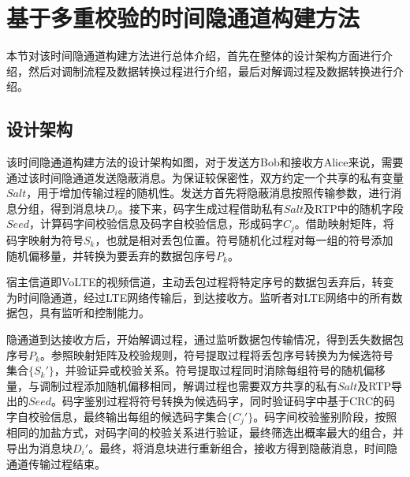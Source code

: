 \section{基于多重校验的时间隐通道构建方法}
\label{chap:hash:results}

本节对该时间隐通道构建方法进行总体介绍，首先在整体的设计架构方面进行介绍，然后对调制流程及数据转换过程进行介绍，最后对解调过程及数据转换进行介绍。

\subsection{设计架构}
\label{chap:hash:results:model}


该时间隐通道构建方法的设计架构如图，对于发送方Bob和接收方Alice来说，需要通过该时间隐通道发送隐蔽消息。为保证较保密性，双方约定一个共享的私有变量$Salt$，用于增加传输过程的随机性。发送方首先将隐蔽消息按照传输参数，进行消息分组，得到消息块$D_{i}$。接下来，码字生成过程借助私有$Salt$及RTP中的随机字段$Seed$，计算码字间校验信息及码字自校验信息，形成码字$C_{j}$。借助映射矩阵，将码字映射为符号$S_{k}$，也就是相对丢包位置。符号随机化过程对每一组的符号添加随机偏移量，并转换为要丢弃的数据包序号$P_{k}$。

宿主信道即VoLTE的视频信道，主动丢包过程将特定序号的数据包丢弃后，转变为时间隐通道，经过LTE网络传输后，到达接收方。监听者对LTE网络中的所有数据包，具有监听和控制能力。

隐通道到达接收方后，开始解调过程，通过监听数据包传输情况，得到丢失数据包序号$P_{k}$。参照映射矩阵及校验规则，符号提取过程将丢包序号转换为为候选符号集合$\{S_{k}'\}$，并验证异或校验关系。符号提取过程同时消除每组符号的随机偏移量，与调制过程添加随机偏移相同，解调过程也需要双方共享的私有$Salt$及RTP导出的$Seed$。码字鉴别过程将符号转换为候选码字，同时验证码字中基于CRC的码字自校验信息，最终输出每组的候选码字集合$\{C_{j}'\}$。码字间校验鉴别阶段，按照相同的加盐方式，对码字间的校验关系进行验证，最终筛选出概率最大的组合，并导出为消息块$D_{i}'$。最终，将消息块进行重新组合，接收方得到隐蔽消息，时间隐通道传输过程结束。


